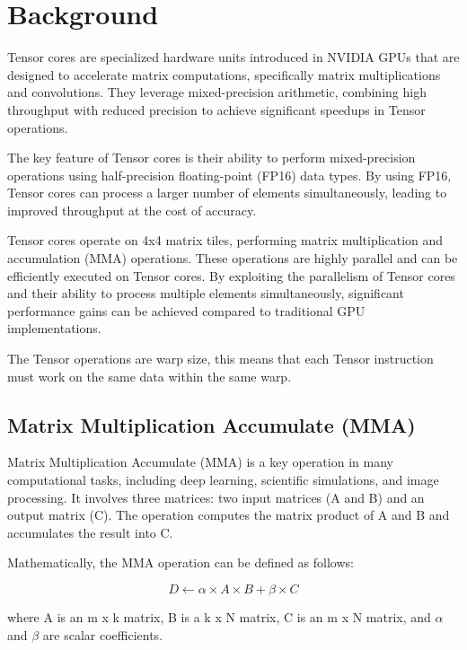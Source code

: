 \documentclass[conference]{IEEEtran}
\begin{document}
  \section{Background}\label{sec:background}
  

  Tensor cores are specialized hardware units introduced in NVIDIA GPUs that are designed to accelerate matrix computations, 
  specifically matrix multiplications and convolutions. They leverage mixed-precision arithmetic, 
  combining high throughput with reduced precision to achieve significant speedups in Tensor operations.
  
  The key feature of Tensor cores is their ability to perform mixed-precision operations using 
  half-precision floating-point (FP16) data types. By using FP16, Tensor cores can process a larger 
  number of elements simultaneously, leading to improved throughput at the cost of accuracy.\cite{precision_FMA} 
  
  Tensor cores operate on 4x4 matrix tiles, performing matrix multiplication and accumulation (MMA) 
  operations. These operations are highly parallel and can be efficiently executed on Tensor cores. 
  By exploiting the parallelism of Tensor cores and their ability to process multiple elements 
  simultaneously, significant performance gains can be achieved compared to traditional GPU 
  implementations.

  The Tensor operations are warp size, this means that each Tensor instruction must work on the same 
  data within the same warp.
  
  \subsection{Matrix Multiplication Accumulate (MMA)}\label{sec:mma}
  
  Matrix Multiplication Accumulate (MMA) is a key operation in many computational tasks, including deep 
  learning, scientific simulations, and image processing. It involves three matrices: two input matrices 
  (A and B) and an output matrix (C). The operation computes the matrix product of A and B and accumulates 
  the result into C.
  
  Mathematically, the MMA operation can be defined as follows:
  
  \[ D \leftarrow \alpha \times A \times B + \beta \times C \]
  
  where A is an m x k matrix, B is a k x N matrix, C is an m x N matrix, and $\alpha$ and $\beta$ are scalar coefficients.
  
\end{document}

